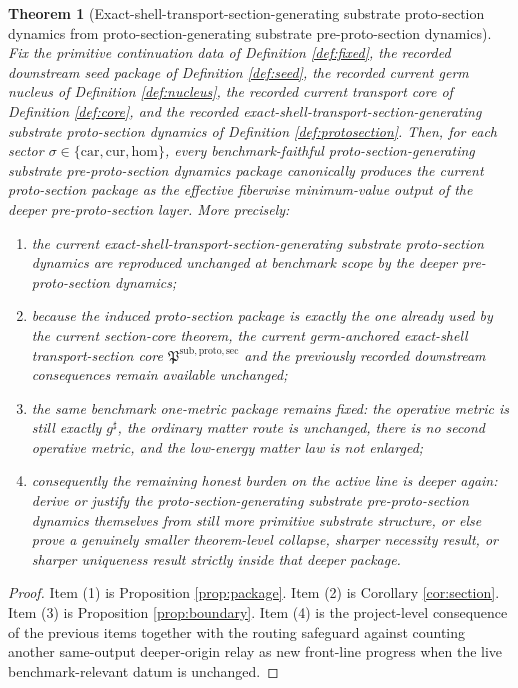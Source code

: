 \documentclass[11pt]{article}
\newcommand{\CompletedMetric}{g^{\sharp}}
\newcommand{\Car}{\mathrm{car}}
\newcommand{\Cur}{\mathrm{cur}}
\newcommand{\Hom}{\mathrm{hom}}
\newcommand{\ProtoSectionCore}{\mathfrak P^{\mathrm{sub,proto,sec}}}
\newtheorem{theorem}{Theorem}
\begin{document}
\begin{theorem}[Exact-shell-transport-section-generating substrate proto-section dynamics from proto-section-generating substrate pre-proto-section dynamics]
\label{thm:main}
Fix the primitive continuation data of Definition \ref{def:fixed}, the recorded downstream seed package of Definition \ref{def:seed}, the recorded current germ nucleus of Definition \ref{def:nucleus}, the recorded current transport core of Definition \ref{def:core}, and the recorded exact-shell-transport-section-generating substrate proto-section dynamics of Definition \ref{def:protosection}. Then, for each sector \(\sigma\in\{\Car,\Cur,\Hom\}\), every benchmark-faithful proto-section-generating substrate pre-proto-section dynamics package canonically produces the current proto-section package as the effective fiberwise minimum-value output of the deeper pre-proto-section layer. More precisely:
\begin{enumerate}
    \item the current exact-shell-transport-section-generating substrate proto-section dynamics are reproduced unchanged at benchmark scope by the deeper pre-proto-section dynamics;
    \item because the induced proto-section package is exactly the one already used by the current section-core theorem, the current germ-anchored exact-shell transport-section core \(\ProtoSectionCore\) and the previously recorded downstream consequences remain available unchanged;
    \item the same benchmark one-metric package remains fixed: the operative metric is still exactly \(\CompletedMetric\), the ordinary matter route is unchanged, there is no second operative metric, and the low-energy matter law is not enlarged;
    \item consequently the remaining honest burden on the active line is deeper again: derive or justify the proto-section-generating substrate pre-proto-section dynamics themselves from still more primitive substrate structure, or else prove a genuinely smaller theorem-level collapse, sharper necessity result, or sharper uniqueness result strictly inside that deeper package.
\end{enumerate}
\end{theorem}

\begin{proof}
Item (1) is Proposition \ref{prop:package}. Item (2) is Corollary \ref{cor:section}. Item (3) is Proposition \ref{prop:boundary}. Item (4) is the project-level consequence of the previous items together with the routing safeguard against counting another same-output deeper-origin relay as new front-line progress when the live benchmark-relevant datum is unchanged.
\end{proof}
\end{document}
